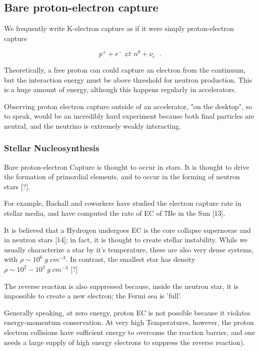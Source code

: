 \documentclass[11pt]{amsart}
\begin{document}
\subsection{Bare proton-electron capture}


We frequently write K-electron capture as if it were simply proton-electron capture

$$p^{+}+e^{-} \rightleftarrows n^{0}+\nu_{e}\;\;.$$

Theoretically, a free proton can could capture an electron from the continuum, but the interaction energy must be  above threshold for neutron production.  This is a huge amount of energy, although this happens regularly in  accelerators.

Observing proton electron capture outside of an accelerator, "on the desktop", so to speak, would be an incredibly hard experiment because both final particles are neutral, and  the neutrino is extremely weakly interacting.

\subsubsection{Stellar Nucleosynthesis}

Bare proton-electron Capture is thought to occur in stars.  It is thought to drive the formation of primordial elements, and to occur in the forming of neutron stars [?].

For example, Bachall and coworkers have studied the electron capture rate in stellar media, and have computed the rate of EC of 7Be in the Sun [13].

It is believed that a Hydrogen undergoes EC is the core collapse supernovae and in neutron stars [14]; in fact, it is thought to create stellar instability. While we usually characterize a star by it's temperature, these are also very dense systems, with $\rho\sim 10^6\;g\;cm^{-3}$.  In contrast, the smallest star has density $\rho\sim 10^{2}-10^{3}\;g\;cm^{-3}$ [?]

The reverse reaction is also suppressed because, inside the neutron star, it is impossible to create a new electron; the Fermi sea is 'full'.

Generally speaking, at zero energy, proton EC is not possible because it violates energy-momentum conservation.
At very high Temperatures, however, the proton electron collisions have sufficient energy to overcome the reaction barrier, and one needs a large supply of high energy electrons to suppress the reverse reaction).
\end{document}
